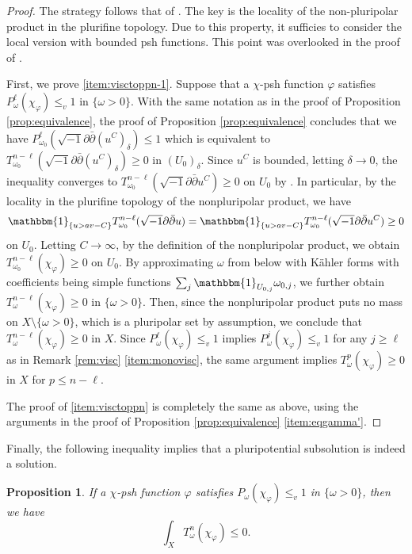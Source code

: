 \documentclass[10pt,a4paper]{amsart}
\numberwithin{equation}{section}
\newtheorem{prop}[equation]{Proposition}
\newcommand{\delb}{\sqrt{-1}\partial\bar{\partial}}
\begin{document}
\begin{proof}
    The strategy follows that of \cite[Proposition 1.11, Theorem 1.9, and Corollary 2.6]{EGZ}. The key is the locality of the non-pluripolar product in the plurifine topology. Due to this property, it sufficies to consider the local version with bounded psh functions. This point was overlooked in the proof of \cite[Lemma 2.13]{Mur}.
    
    First, we prove \ref{item:visctoppn-1}. Suppose that a $\chi$-psh function $\varphi$ satisfies $P^\ell_\omega(\chi_\varphi)\le_v 1$ in $\{\omega>0\}$. With the same notation as in the proof of Proposition \ref{prop:equivalence}, the proof of Proposition \ref{prop:equivalence} concludes that we have $P^\ell_{\omega_0}(\delb (u^C)_\delta)\le1$ which is equivalent to $T^{n-\ell}_{\omega_0}(\delb (u^C)_\delta)\ge0$ in $(U_0)_\delta$. Since $u^C$ is bounded, letting $\delta\to0$, the inequality converges to $T^{n-\ell}_{\omega_0}(\delb u^C)\ge0$ on $U_0$ by \cite[Theorem 2.1]{BT}. In particular, by the locality in the plurifine topology of the nonpluripolar product, we have 
    \begin{equation*}
        \mathbbm{1}_{\{u>av-C\}}T_{\omega_0}^{n-\ell}(\delb u)=\mathbbm{1}_{\{u>av-C\}} T^{n-\ell}_{\omega_0}(\delb u^C)\ge0
    \end{equation*}
    on $U_0$. Letting $C\to\infty$, by the definition of the nonpluripolar product, we obtain $T^{n-\ell}_{\omega_0}(\chi_\varphi)\ge0$ on $U_0$.
    By approximating $\omega$ from below with Kähler forms with coefficients being simple functions $\sum_j\mathbbm{1}_{U_{0,j}}\omega_{0,j}$, we further obtain $T^{n-\ell}_\omega(\chi_\varphi)\ge0$ in $\{\omega>0\}$. Then, since the nonpluripolar product puts no mass on $X\setminus
    \{\omega>0\}$, which is a pluripolar set by assumption, we conclude that $T^{n-\ell}_\omega(\chi_\varphi)\ge0$ in $X$. Since $P^\ell_\omega(\chi_\varphi)\le_v1$ implies $P^j_\omega(\chi_\varphi)\le_v1$ for any $j\ge \ell$ as in Remark \ref{rem:visc} \ref{item:monovisc}, the same argument implies $T^p_\omega(\chi_\varphi)\ge0$ in $X$ for $p\le n-\ell$.

    The proof of \ref{item:visctoppn} is completely the same as above, using the arguments in the proof of Proposition \ref{prop:equivalence} \ref{item:eqgamma'}. 
\end{proof}

Finally, the following inequality implies that a pluripotential subsolution is indeed a solution.

\begin{prop}\label{prop:superineq}
    If a $\chi$-psh function $\varphi$ satisfies $P_\omega(\chi_\varphi)\le_v 1$ in $\{\omega>0\}$, then we have
    $$\int_X T^n_\omega(\chi_\varphi)\le0.$$
\end{prop}
\end{document}
